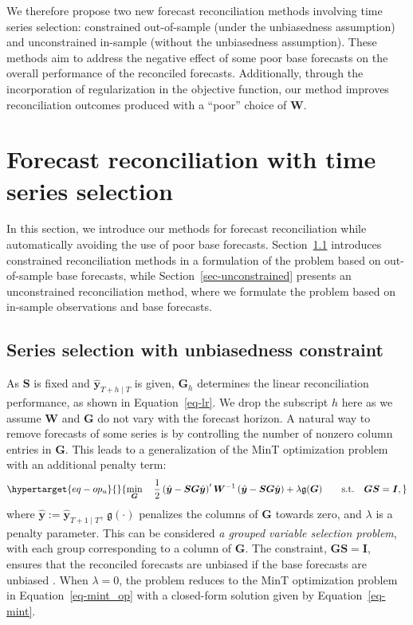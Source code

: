 \documentclass[
  11pt]{article}
\begin{document}
We therefore propose two new forecast reconciliation methods involving
time series selection: constrained out-of-sample (under the unbiasedness
assumption) and unconstrained in-sample (without the unbiasedness
assumption). These methods aim to address the negative effect of some
poor base forecasts on the overall performance of the reconciled
forecasts. Additionally, through the incorporation of regularization in
the objective function, our method improves reconciliation outcomes
produced with a ``poor'' choice of \(\bm{W}\).

\hypertarget{sec-methodology}{%
\section{Forecast reconciliation with time series
selection}\label{sec-methodology}}

In this section, we introduce our methods for forecast reconciliation
while automatically avoiding the use of poor base forecasts.
Section~\ref{sec-constrained} introduces constrained reconciliation
methods in a formulation of the problem based on out-of-sample base
forecasts, while Section~\ref{sec-unconstrained} presents an
unconstrained reconciliation method, where we formulate the problem
based on in-sample observations and base forecasts.

\hypertarget{sec-constrained}{%
\subsection{Series selection with unbiasedness
constraint}\label{sec-constrained}}

As \(\bm{S}\) is fixed and \(\hat{\bm{y}}_{T+h \mid T}\) is given,
\(\bm{G}_h\) determines the linear reconciliation performance, as shown
in Equation~\ref{eq-lr}. We drop the subscript \(h\) here as we assume
\(\bm{W}\) and \(\bm{G}\) do not vary with the forecast horizon. A
natural way to remove forecasts of some series is by controlling the
number of nonzero column entries in \(\bm{G}\). This leads to a
generalization of the MinT optimization problem with an additional
penalty term: \begin{equation}\protect\hypertarget{eq-op_u}{}{
\min_{\bm{G}} \quad \frac{1}{2}\left(\hat{\bm{y}}-\bm{SG}\hat{\bm{y}}\right)^{\prime} \bm{W}^{-1}\left(\hat{\bm{y}}-\bm{SG}\hat{\bm{y}}\right)
+ \lambda\mathfrak{g}(\bm{G}) \qquad \text{s.t.} \quad \bm{G}\bm{S}=\bm{I},
}\label{eq-op_u}\end{equation} where
\(\hat{\bm{y}}:=\hat{\bm{y}}_{T+1 \mid T}\), \(\mathfrak{g}(\cdot)\)
penalizes the columns of \(\bm{G}\) towards zero, and \(\lambda\) is a
penalty parameter. This can be considered \emph{a grouped variable
selection problem}, with each group corresponding to a column of
\(\bm{G}\). The constraint, \(\bm{G}\bm{S}=\bm{I}\), ensures that the
reconciled forecasts are unbiased if the base forecasts are unbiased
\citep{Wickramasuriya2019-fc}. When \(\lambda = 0\), the problem reduces
to the MinT optimization problem in Equation~\ref{eq-mint_op} with a
closed-form solution given by Equation~\ref{eq-mint}.
\end{document}

